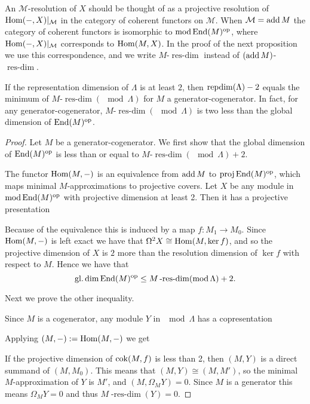 An $\mathcal M$-resolution of $X$ should be thought of as a projective resolution of $\operatorname{Hom}(-, X)|_{\mathcal M}$ in the category of coherent functors on $\mathcal M$. When $\mathcal M = \operatorname{add} M$ the category of coherent functors is isomorphic to $\operatorname{mod} \operatorname{End}(M)^{\operatorname{op}}$, where $\operatorname{Hom}(-, X)|_{\mathcal M}$ corresponds to $\operatorname{Hom}(M, X)$. In the proof of the next proposition we use this correspondence, and we write $M$-$\operatorname{res-dim}$ instead of $(\operatorname{add} M)$-$\operatorname{res-dim}$. 

\begin{prop}\label{prop:repdim_resdim+2}
	If the representation dimension of $\Lambda$ is at least $2$, then $\operatorname{repdim}(\Lambda) - 2$ equals the minimum of $M$-$\operatorname{res-dim}(\mod \Lambda)$ for $M$ a generator-cogenerator. In fact, for any generator-cogenerator, $M$-$\operatorname{res-dim}(\mod \Lambda)$ is two less than the global dimension of $\operatorname{End}(M)^{\operatorname{op}}$.
	\begin{proof}
		Let $M$ be a generator-cogenerator. We first show that the global dimension of $\operatorname{End}(M)^{\operatorname{op}}$ is less than or equal to $M$-$\operatorname{res-dim}(\mod \Lambda) + 2$. 
		
		The functor $\operatorname{Hom}(M, -)$ is an equivalence from $\operatorname{add} M$ to $\operatorname{proj}\operatorname{End}(M)^{\operatorname{op}}$, which maps minimal $M$-approximations to projective covers. Let $X$ be any module in $\operatorname{mod}\operatorname{End}(M)^{\operatorname{op}}$ with projective dimension at least 2. Then it has a projective presentation 
		\begin{center}
		\end{center}
		Because of the equivalence this is induced by a map $f\colon M_1\to M_0$. Since $\operatorname{Hom}(M,-)$ is left exact we have that $\Omega^2X \cong \operatorname{Hom}(M, \ker f)$, and so the projective dimension of $X$ is $2$ more than the resolution dimension of $\ker f$ with respect to $M$. Hence  we have that $$\operatorname{gl.dim}\operatorname{End}(M)^{\operatorname{op}} \leq M\operatorname{-res-dim}(\operatorname{mod} \Lambda) + 2.$$
		
		Next we prove the other inequality.
		
		Since $M$ is a cogenerator, any module $Y$ in $\mod\Lambda$ has a copresentation 
		\begin{center}
		\end{center}
		Applying $(M,-) := \operatorname{Hom}(M,-)$ we get
		\begin{center}
		\end{center}
		If the projective dimension of $\operatorname{cok}(M,f)$ is less than 2, then $(M, Y)$ is a direct summand of $(M, M_0)$. This means that $(M,Y) \cong (M, M')$, so the minimal $M$-approximation of $Y$ is $M'$, and $(M, \Omega_M Y) = 0$. Since $M$ is a generator this means $\Omega_M Y = 0$ and thus $M\operatorname{-res-dim}(Y)=0$.
		

\end{proof}
\end{prop}
